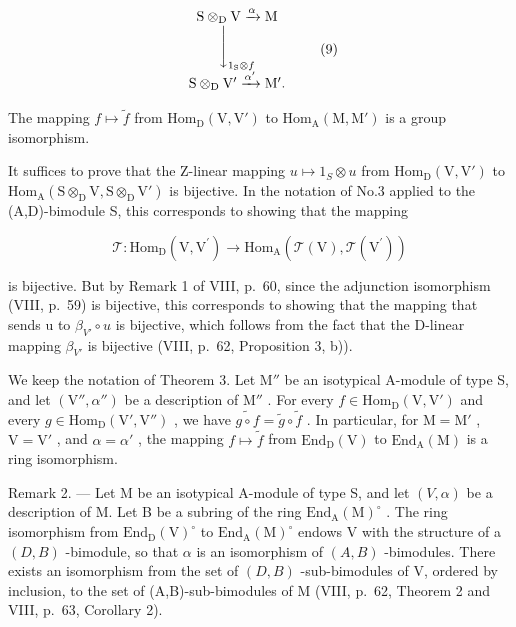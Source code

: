 \[
\begin{array}{c} \mathrm{S} \otimes_ {\mathrm{D}} \mathrm{V} \xrightarrow {\alpha} \mathrm{M} \\ \Biggl \downarrow_ {1 _ {\mathrm{S}} \otimes f} \\ \mathrm{S} \otimes_ {\mathrm{D}} \mathrm{V} ^ {\prime} \xrightarrow {\alpha^ {\prime}} \mathrm{M} ^ {\prime}. \end{array}\tag{9}
\]

The mapping \(f \mapsto \widetilde{f}\) from \(\mathrm{Hom}_{\mathrm{D}}(\mathrm{V},\mathrm{V}')\) to \(\mathrm{Hom}_{\mathrm{A}}(\mathrm{M},\mathrm{M}')\) is a group isomorphism.

It suffices to prove that the Z-linear mapping \(u \mapsto 1_{S} \otimes u\) from \(\mathrm{Hom}_{\mathrm{D}}(\mathrm{V}, \mathrm{V}')\) to \(\mathrm{Hom}_{\mathrm{A}}(\mathrm{S} \otimes_{\mathrm{D}} \mathrm{V}, \mathrm{S} \otimes_{\mathrm{D}} \mathrm{V}')\) is bijective. In the notation of No.3 applied to the (A,D)-bimodule S, this corresponds to showing that the mapping

\[
\mathcal {T}: \mathrm{Hom} _ {\mathrm{D}} (\mathrm{V}, \mathrm{V} ^ {\prime}) \longrightarrow \mathrm{Hom} _ {\mathrm{A}} (\mathcal {T} (\mathrm{V}), \mathcal {T} (\mathrm{V} ^ {\prime}))
\]

is bijective. But by Remark 1 of VIII, p.~60, since the adjunction isomorphism (VIII, p.~59) is bijective, this corresponds to showing that the mapping that sends u to \(\beta_{V'} \circ u\) is bijective, which follows from the fact that the D-linear mapping \(\beta_{V'}\) is bijective (VIII, p.~62, Proposition 3, b)).

We keep the notation of Theorem 3. Let \(\mathrm{M}''\) be an isotypical A-module of type S, and let \((\mathrm{V}'',\alpha '')\) be a description of \(\mathrm{M}''\) . For every \(f\in \mathrm{Hom}_{\mathrm{D}}(\mathrm{V},\mathrm{V}')\) and every \(g\in \mathrm{Hom}_{\mathrm{D}}(\mathrm{V}',\mathrm{V}'')\) , we have \(\widetilde{g\circ f} = \widetilde{g}\circ \widetilde{f}\) . In particular, for \(\mathrm{M} = \mathrm{M}'\) , \(\mathrm{V} = \mathrm{V}'\) , and \(\alpha = \alpha '\) , the mapping \(f\mapsto \widetilde{f}\) from \(\mathrm{End}_{\mathrm{D}}(\mathrm{V})\) to \(\mathrm{End}_{\mathrm{A}}(\mathrm{M})\) is a ring isomorphism.

Remark 2. --- Let M be an isotypical A-module of type S, and let \((V,\alpha)\) be a description of M. Let B be a subring of the ring \(\mathrm{End}_{\mathrm{A}}(\mathrm{M})^{\circ}\) . The ring isomorphism from \(\mathrm{End}_{\mathrm{D}}(\mathrm{V})^{\circ}\) to \(\mathrm{End}_{\mathrm{A}}(\mathrm{M})^{\circ}\) endows V with the structure of a \((D,B)\) -bimodule, so that \(\alpha\) is an isomorphism of \((A,B)\) -bimodules. There exists an isomorphism from the set of \((D,B)\) -sub-bimodules of V, ordered by inclusion, to the set of (A,B)-sub-bimodules of M (VIII, p.~62, Theorem 2 and VIII, p.~63, Corollary 2).

